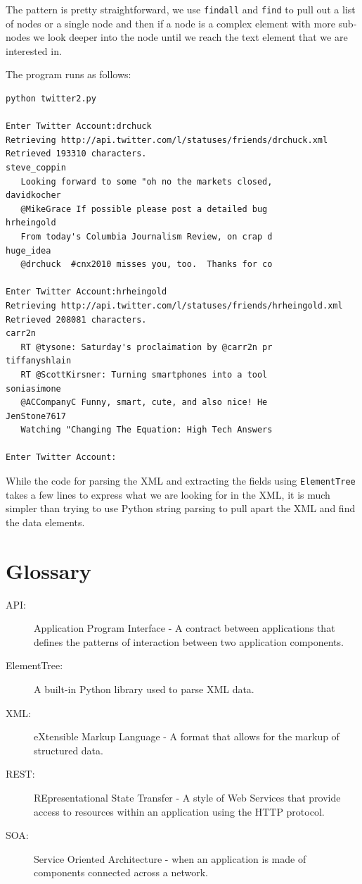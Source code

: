 \documentclass[11pt]{book}
\begin{document}
The pattern is pretty straightforward, we use {\tt findall} and {\tt find}
to pull out a list of nodes or a single node and then if a node is a complex
element with more sub-nodes we look deeper into the node until we reach the 
text element that we are interested in.

The program runs as follows:

\beforeverb
\begin{verbatim}
python twitter2.py 

Enter Twitter Account:drchuck
Retrieving http://api.twitter.com/l/statuses/friends/drchuck.xml
Retrieved 193310 characters.
steve_coppin
   Looking forward to some "oh no the markets closed,
davidkocher
   @MikeGrace If possible please post a detailed bug 
hrheingold
   From today's Columbia Journalism Review, on crap d
huge_idea
   @drchuck  #cnx2010 misses you, too.  Thanks for co

Enter Twitter Account:hrheingold
Retrieving http://api.twitter.com/l/statuses/friends/hrheingold.xml
Retrieved 208081 characters.
carr2n
   RT @tysone: Saturday's proclaimation by @carr2n pr
tiffanyshlain
   RT @ScottKirsner: Turning smartphones into a tool 
soniasimone
   @ACCompanyC Funny, smart, cute, and also nice! He 
JenStone7617
   Watching "Changing The Equation: High Tech Answers

Enter Twitter Account:
\end{verbatim}
\afterverb
%
While the code for parsing the XML and extracting the fields
using {\tt ElementTree} takes a few lines to express what 
we are looking for in the XML, it is much simpler than trying 
to use Python string parsing to pull apart the XML and find 
the data elements.

\section{Glossary}

\begin{description}

\item[API:] Application Program Interface - A contract between
applications that defines the patterns of interaction between 
two application components.

\item[ElementTree:] A built-in Python library used to parse XML data.

\item[XML:] eXtensible Markup Language - A format that allows for 
the markup of structured data.

\item[REST:] REpresentational State Transfer - A style of Web Services 
that provide access to resources within an application using the HTTP
protocol.

\item[SOA:] Service Oriented Architecture - when an application is 
made of components connected across a network.

\end{description}
\end{document}
